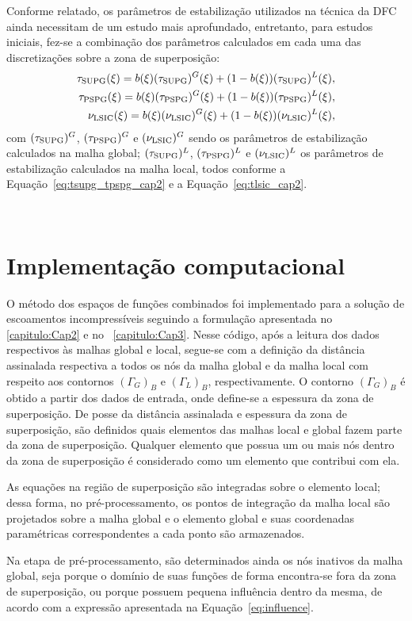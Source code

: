 Conforme relatado, os parâmetros de estabilização utilizados na técnica da DFC ainda necessitam de um estudo mais aprofundado, entretanto, para estudos iniciais, fez-se a combinação dos parâmetros calculados em cada uma das discretizações sobre a zona de superposição:
\begin{align}
	\tau_{\mathrm{SUPG}}(\xi) =  b(\xi)(\tau_{\mathrm{SUPG}})^{G}(\xi) + (1-b(\xi))(\tau_{\mathrm{SUPG}})^{L}(\xi),\\
	\tau_{\mathrm{PSPG}}(\xi) =  b(\xi)(\tau_{\mathrm{PSPG}})^{G}(\xi) + (1-b(\xi))(\tau_{\mathrm{PSPG}})^{L}(\xi),\\
	\nu_{\mathrm{LSIC}}(\xi) =  b(\xi)(\nu_{\mathrm{LSIC}})^{G}(\xi) + (1-b(\xi))(\nu_{\mathrm{LSIC}})^{L}(\xi),
\end{align}
\noindent com $(\tau_{\mathrm{SUPG}})^{G}$, $(\tau_{\mathrm{PSPG}})^{G}$ e $(\nu_{\mathrm{LSIC}})^{G}$ sendo os parâmetros de estabilização calculados na malha global; $(\tau_{\mathrm{SUPG}})^{L}$, $(\tau_{\mathrm{PSPG}})^{L}$ e  $(\nu_{\mathrm{LSIC}})^{L}$ os parâmetros de estabilização calculados na malha local, todos conforme a Equação~\eqref{eq:tsupg_tpspg_cap2} e a Equação~\eqref{eq:tlsic_cap2}.

\

\section{Implementação computacional}

O método dos espaços de funções combinados foi implementado para a solução de escoamentos incompressíveis seguindo a formulação apresentada no \autoref{capitulo:Cap2} e no ~\autoref{capitulo:Cap3}. Nesse código, após a leitura dos dados respectivos às malhas global e local, segue-se com a definição da distância assinalada respectiva a todos os nós da malha global e da malha local com respeito aos contornos $(\Gamma_{G})_{B}$ e $(\Gamma_{L})_{B}$, respectivamente. O contorno  $(\Gamma_{G})_{B}$ é obtido a partir dos dados de entrada, onde define-se a espessura da zona de superposição. De posse da distância assinalada e espessura da zona de superposição, são definidos quais elementos das malhas local e global fazem parte da zona de superposição. Qualquer elemento que possua um ou mais nós dentro da zona de superposição é considerado como um elemento que contribui com ela.

As equações na região de superposição são integradas sobre o elemento local; dessa forma, no pré-processamento, os pontos de integração da malha local são projetados sobre a malha global e o elemento global e suas coordenadas paramétricas correspondentes a cada ponto são armazenados. 

Na etapa de pré-processamento, são determinados ainda os nós inativos da malha global, seja porque o domínio de suas funções de forma encontra-se fora da zona de superposição, ou porque possuem pequena influência dentro da mesma, de acordo com a expressão apresentada na Equação~\eqref{eq:influence}. 

